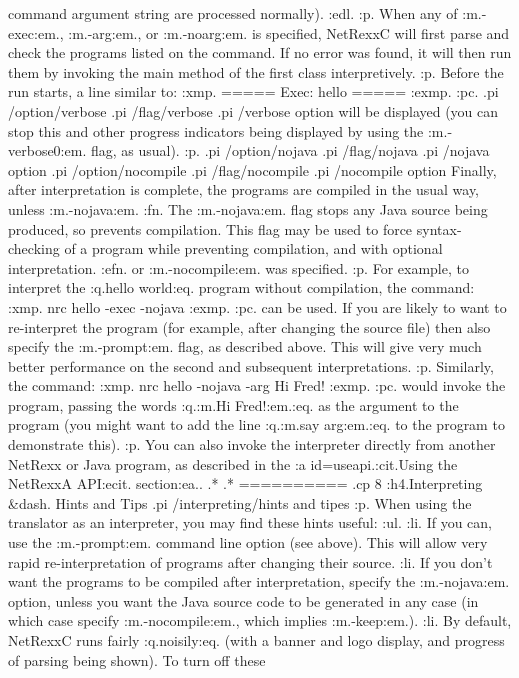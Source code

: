 command argument string are processed normally).
:edl.
:p.
When any of :m.-exec:em., :m.-arg:em., or :m.-noarg:em. is specified,
NetRexxC will first parse and check the programs listed on the command.
If no error was found, it will then run them by invoking the main method
of the first class interpretively.
:p.
Before the run starts, a line similar to:
:xmp.
===== Exec: hello =====
:exmp.
:pc.
.pi /option/verbose
.pi /flag/verbose
.pi /verbose option
will be displayed (you can stop this and other progress indicators being
displayed by using the :m.-verbose0:em. flag, as usual).
:p.
.pi /option/nojava
.pi /flag/nojava
.pi /nojava option
.pi /option/nocompile
.pi /flag/nocompile
.pi /nocompile option
Finally, after interpretation is complete, the programs are compiled in
the usual way, unless :m.-nojava:em.
:fn.
The :m.-nojava:em. flag stops any Java source being produced, so
prevents compilation.  This flag may be used to force syntax-checking of
a program while preventing compilation, and with optional
interpretation.
:efn.
or :m.-nocompile:em. was specified.
:p.
For example, to interpret the :q.hello world:eq. program without
compilation, the command:
:xmp.
nrc hello -exec -nojava
:exmp.
:pc.
can be used.  If you are likely to want to re-interpret the program (for
example, after changing the source file) then also specify
the :m.-prompt:em. flag, as described above.  This will give very much
better performance on the second and subsequent interpretations.
:p.
Similarly, the command:
:xmp.
nrc hello -nojava -arg Hi Fred!
:exmp.
:pc.
would invoke the program, passing the words :q.:m.Hi Fred!:em.:eq. as
the argument to the program (you might want to add the line :q.:m.say
arg:em.:eq. to the program to demonstrate this).
:p.
You can also invoke the interpreter directly from another NetRexx or
Java program, as described in the :a id=useapi.:cit.Using the NetRexxA
API:ecit. section:ea..
.*
.* ==========
.cp 8
:h4.Interpreting &dash. Hints and Tips
.pi /interpreting/hints and tipes
:p.
When using the translator as an interpreter, you may find these hints
useful:
:ul.
:li.
If you can, use the :m.-prompt:em. command line option (see above).
This will allow very rapid re-interpretation of programs after changing
their source.
:li.
If you don't want the programs to be compiled after interpretation,
specify the :m.-nojava:em. option, unless you want the Java source code
to be generated in any case (in which case specify :m.-nocompile:em.,
which implies :m.-keep:em.).
:li.
By default, NetRexxC runs fairly :q.noisily:eq. (with a banner and logo
display, and progress of parsing being shown).  To turn off these
